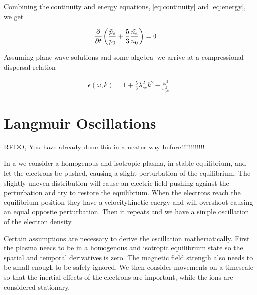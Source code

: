   Combining the continuity and energy equations, \cref{eq:continuity} and \cref{eq:energy}, we get

  \begin{align}
    \pdv{}{t}\left( \frac{\tilde{p}_e}{p_0} + \frac{5}{3} \frac{\tilde{n_e}}{n_0} \right) &= 0
  \end{align}

  \noindent Assuming plane wave solutions and some algebra, we arrive at a compressional dispersal relation

  \begin{align}
    \epsilon(\omega, k) = 1 + \frac{5}{3} \lambda_{se}^2k ^2 -  \frac{\omega^2}{\omega_{pe}^2}
  \end{align}


\section{Langmuir Oscillations}
	REDO, You have already done this in a neater way before!!!!!!!!!!!!

	In a we consider a homogenous and isotropic plasma, in stable equilibrium,
	and let the electrons be pushed, causing a slight perturbation of the equilibrium.
	The slightly uneven distribution will cause an electric field pushing against
	the perturbation and try to restore the equilibrium. When the electrons reach
	the equilibrium position they have a velocitykinetic energy and will overshoot
 	causing an equal opposite perturbation. Then it repeats and we have a simple
	oscillation of the electron density.

	Certain assumptions are necessary to derive the oscillation mathematically.
	First the plasma needs to be in a homogenous and isotropic equilibrium state
 	so the spatial and temporal derivatives is zero. The magnetic field strength
	also needs to be small enough to be safely ignored.	We then consider movements
	on a timescale so that the inertial effects of the electrons are important,
	while the ions are considered stationary.

